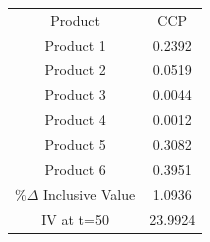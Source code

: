 \begin{tabular}{cc}
Product & CCP \\
Product 1 & 0.2392 \\
Product 2 & 0.0519 \\
Product 3 & 0.0044 \\
Product 4 & 0.0012 \\
Product 5 & 0.3082 \\
Product 6 & 0.3951 \\
$\%\Delta$ Inclusive Value & 1.0936 \\
IV at t=50 & 23.9924 \\
\end{tabular}
